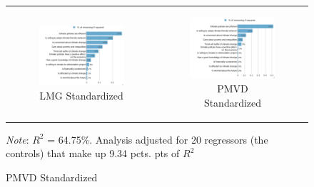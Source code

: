 \documentclass{article}
\begin{document}
\begin{figure}[h!]
\begin{center}
	\begin{tabular}{cc}
		\begin{subfigure}{0.5\textwidth}
		\caption{LMG Standardized}
			\includegraphics[width=\textwidth]{lmg_all_policies_standardized}
		\end{subfigure}&
		\begin{subfigure}{0.5\textwidth}
		\caption{PMVD Standardized}
			\includegraphics[width=\textwidth]{pmvd_all_policies_standardized}
		\end{subfigure}\\
	\end{tabular}
	{\footnotesize \textit{Note}:  $R^2$ = 64.75\%. Analysis adjusted for 20 regressors (the controls) that make up 9.34 pcts. pts of $R^2$}
\end{center}
\end{figure}
\end{document}
